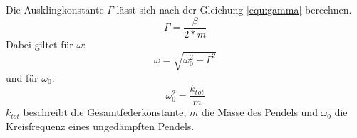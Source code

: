Die Ausklingkonstante $\Gamma$ lässt sich nach der Gleichung \ref{equ:gamma} berechnen.
\begin{equation}
\Gamma = \frac{\beta}{2*m}
\label{equ:gamma}
\end{equation}
Dabei giltet für $\omega$:
\begin{equation}
\omega = \sqrt{\omega_{0}^{2}-\Gamma^{2}}
\label{equ:omega}
\end{equation}
und für $\omega_{0}$:
\begin{equation}
\omega_{0}^{2} = \frac{k_{tot}}{m}
\end{equation}
$k_{tot}$ beschreibt die Gesamtfederkonstante, $m$ die Masse des Pendels und $\omega_{0}$ die Kreisfrequenz eines ungedämpften Pendels.
